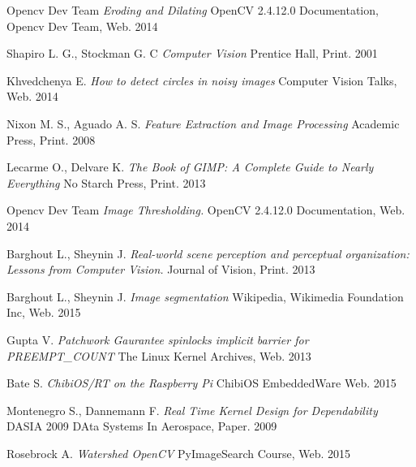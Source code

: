 \documentclass[12pt,twoside,a4paper]{article}
\begin{document}
\begin{thebibliography}{9}
Opencv Dev Team
\textit{Eroding and Dilating} OpenCV 2.4.12.0 Documentation, Opencv Dev Team, Web. 2014

Shapiro L. G., Stockman G. C
\textit{Computer Vision} Prentice Hall, Print. 2001

Khvedchenya E.
\textit{How to detect circles in noisy images} Computer Vision Talks, Web. 2014

Nixon M. S., Aguado A. S.
\textit{Feature Extraction and Image Processing} Academic Press, Print. 2008

Lecarme  O., Delvare K.
\textit{The Book of GIMP: A Complete Guide to Nearly Everything} No Starch Press, Print. 2013

Opencv Dev Team
\textit{Image Thresholding.} OpenCV 2.4.12.0 Documentation, Web. 2014

Barghout L., Sheynin J.
\textit{Real-world scene perception and perceptual organization: Lessons from Computer Vision.} Journal of Vision, Print. 2013

Barghout L., Sheynin J.
\textit{Image segmentation} Wikipedia, Wikimedia Foundation Inc, Web. 2015

Gupta V.
\textit{Patchwork Gaurantee spinlocks implicit barrier for PREEMPT\_COUNT} The Linux Kernel Archives, Web. 2013

Bate S.
\textit{ChibiOS/RT on the Raspberry Pi} ChibiOS EmbeddedWare Web. 2015

Montenegro S., Dannemann F. 
\textit{Real Time Kernel Design for Dependability} DASIA 2009 DAta Systems In Aerospace, Paper. 2009

Rosebrock A.
\textit{Watershed OpenCV} PyImageSearch Course, Web. 2015

\end{thebibliography}
\end{document}
